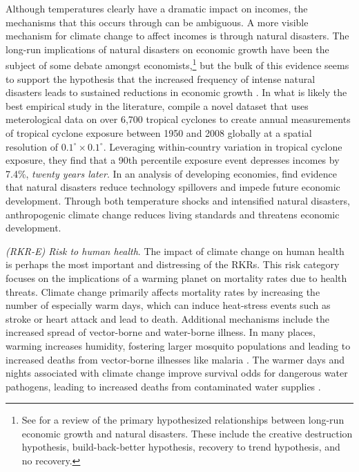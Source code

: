 Although temperatures clearly have a dramatic impact on incomes, the mechanisms that this occurs through can be ambiguous. A more visible mechanism for climate change to affect incomes is through natural disasters. The long-run implications of natural disasters on economic growth have been the subject of some debate amongst economists,\footnote{See \cite{hsiang2014causal} for a review of the primary hypothesized relationships between long-run economic growth and natural disasters. These include the creative destruction hypothesis, build-back-better hypothesis, recovery to trend hypothesis, and no recovery.} but the bulk of this evidence seems to support the hypothesis that the increased frequency of intense natural disasters leads to sustained reductions in economic growth \citep{cea2022rising}. In what is likely the best empirical study in the literature, \cite{hsiang2014causal} compile a novel dataset that uses meterological data on over 6,700 tropical cyclones to create annual measurements of tropical cyclone exposure between 1950 and 2008 globally at a spatial resolution of $0.1^\circ \times 0.1^\circ$. Leveraging within-country variation in tropical cyclone exposure, they find that a 90th percentile exposure event depresses incomes by 7.4\%, \emph{twenty years later}. In an analysis of developing economies, \cite{crespo2008natural} find evidence that natural disasters reduce technology spillovers and impede future economic development. Through both temperature shocks and intensified natural disasters, anthropogenic climate change reduces living standards and threatens economic development. 

\textit{(RKR-E) Risk to human health}. The impact of climate change on human health is perhaps the most important and distressing of the RKRs. This risk category focuses on the implications of a warming planet on mortality rates due to health threats. Climate change primarily affects mortality rates by increasing the number of especially warm days, which can induce heat-stress events such as stroke or heart attack and lead to death. Additional mechanisms include the increased spread of vector-borne and water-borne illness. In many places, warming increases humidity, fostering larger mosquito populations and leading to increased deaths from vector-borne illnesses like malaria \citep{rocklov2020climate}. The warmer days and nights associated with climate change improve survival odds for dangerous water pathogens, leading to increased deaths from contaminated water supplies \citep{levy2018climate}.


